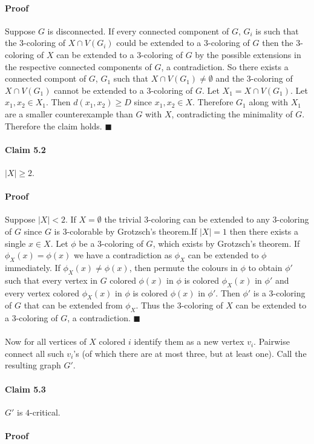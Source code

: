 \documentclass[letterpaper,12pt,oneside,onecolumn]{report}
\begin{document}
\paragraph{Proof}
Suppose $G$ is disconnected. If every connected component of $G$, $G_i$ is such that the $3$-coloring of $X \cap V(G_i)$ could be extended to a $3$-coloring of $G$ then the $3$-coloring of $X$ can be extended to a $3$-coloring of $G$ by the possible extensions in the respective connected components of $G$, a contradiction. So there exists a connected compont of $G$,  $G_1$ such that $X \cap V(G_1) \neq \emptyset$ and the $3$-coloring of $X \cap V(G_1)$ cannot be extended to a $3$-coloring of $G$. Let $X_1 = X \cap V(G_1)$. Let $x_1, x_2 \in X_1$. Then $d(x_1, x_2) \geq D$ since $x_1, x_2 \in X$. Therefore $G_1$ along with $X_1$ are a smaller counterexample than $G$ with $X$, contradicting the minimality of $G$. Therefore the claim holds. $\blacksquare$
\paragraph{Claim 5.2}
$|X| \geq 2$.
\paragraph{Proof}
Suppose $|X| < 2$. If $X = \emptyset$ the trivial $3$-coloring can be extended to any $3$-coloring of $G$ since $G$ is $3$-colorable by Grotzsch's theorem.If $|X| = 1$ then there exists a single $x \in X$.  Let $\phi$ be a $3$-coloring of $G$, which exists by Grotzsch's theorem. If $\phi_X(x) = \phi(x)$ we have a contradiction as $\phi_X$ can be extended to $\phi$ immediately. If $\phi_X(x) \neq \phi(x)$, then permute the colours in $\phi$ to obtain $\phi'$ such that every vertex in $G$ colored $\phi(x)$ in $\phi$ is colored $\phi_X(x)$ in $\phi'$ and every vertex colored $\phi_X(x)$ in $\phi$ is colored $\phi(x)$ in $\phi'$. Then $\phi'$ is a $3$-coloring of $G$ that can be extended from $\phi_X$. Thus the $3$-coloring of $X$ can be extended to a $3$-coloring of $G$, a contradiction. $\blacksquare$
\paragraph{}
Now for all vertices of $X$ colored $i$ identify them as a new vertex $v_i$. Pairwise connect all such $v_i$'s (of which there are at most three, but at least one). Call the resulting graph $G'$.
\paragraph{Claim 5.3}
$G'$ is $4$-critical.
\paragraph{Proof}

\paragraph{}
\end{document}
